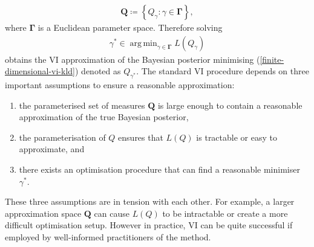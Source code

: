 \documentclass{article}
\DeclareMathOperator*{\argmin}{arg\,min}
\numberwithin{equation}{section}
\begin{document}
\begin{align}
    \boldsymbol{Q} \coloneqq \left\{Q_{\gamma}: \gamma \in \boldsymbol{\Gamma} \right\},
\end{align}
where $\boldsymbol{\Gamma}$ is a Euclidean parameter space. Therefore solving
\begin{align}
    \gamma^* \in \argmin_{\gamma \in \boldsymbol{\Gamma}} L(Q_{\gamma})
\end{align}
obtains the VI approximation of the Bayesian posterior minimising (\ref{finite-dimensional-vi-kld}) denoted as $Q_{\gamma^*}$. 
The standard VI procedure depends on three important assumptions to ensure a reasonable approximation:
\begin{enumerate}
    \setlength\itemsep{-0.25em}
    \item the parameterised set of measures $\boldsymbol{Q}$ is large enough to contain a reasonable approximation of the true Bayesian posterior,
    \item the parameterisation of $Q$ ensures that $L(Q)$ is tractable or easy to approximate, and
    \item there exists an optimisation procedure that can find a reasonable minimiser $\gamma^*$.
\end{enumerate}
These three assumptions are in tension with each other.
For example, a larger approximation space $\boldsymbol{Q}$ can cause $L(Q)$ to be intractable or create a more difficult optimisation setup.
However in practice, VI can be quite successful if employed by well-informed practitioners of the method.
\end{document}
